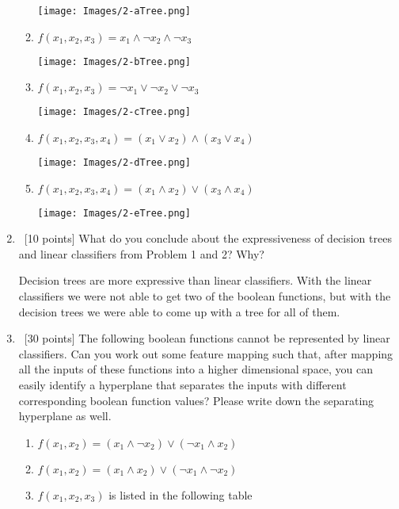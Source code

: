 \documentclass[12pt, fullpage,letterpaper]{article}
\begin{document}
\begin{enumerate}
\begin{enumerate}
\texttt{[image: Images/2-aTree.png]}\\

\item $f(x_1, x_2, x_3) = x_1 \land \neg x_2 \land \neg x_3$

\texttt{[image: Images/2-bTree.png]}\\

\item $f(x_1, x_2, x_3) = \neg x_1 \lor \neg x_2 \lor \neg x_3$

\texttt{[image: Images/2-cTree.png]}\\

\item $f(x_1, x_2, x_3, x_4) = (x_1 \lor x_2) \land (x_3 \lor x_4)$

\texttt{[image: Images/2-dTree.png]}\\

\item $f(x_1, x_2, x_3, x_4) = (x_1 \land x_2) \lor (x_3 \land x_4)$

\texttt{[image: Images/2-eTree.png]}

\end{enumerate}

\item~[10 points] What do you conclude about the expressiveness of decision trees and linear classifiers from Problem 1 and 2? Why? 

Decision trees are more expressive than linear classifiers. With the linear classifiers we were not able to get two
of the boolean functions, but with the decision trees we were able to come up with
a tree for all of them.\\

\item~[30 points] The following boolean functions cannot be represented by linear classifiers. Can you work out some feature mapping such that, after mapping all the inputs of these functions into a higher dimensional space, you can easily identify a hyperplane that separates the inputs with different corresponding boolean function values? Please write down the separating hyperplane as well. 
\begin{enumerate}
\item $f(x_1, x_2) = (x_1 \land \neg x_2) \lor (\neg x_1 \land x_2) $
\item $f(x_1, x_2) = (x_1 \land x_2) \lor (\neg x_1 \land \neg x_2)$
\item $f(x_1, x_2, x_3)$ is listed in the following table


\end{enumerate}
\end{enumerate}
\end{document}
